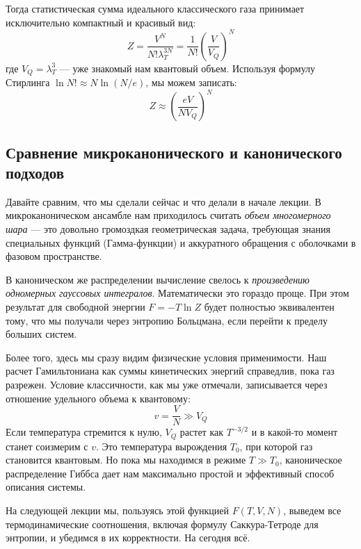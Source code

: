 \documentclass[../general/general]{subfiles}
\begin{document}
Тогда статистическая сумма идеального классического газа принимает исключительно компактный и красивый вид:
\begin{equation}
Z = \frac{V^N}{N! \lambda_T^{3N}} = \frac{1}{N!} \left( \frac{V}{V_Q} \right)^N
\end{equation}
где $V_Q = \lambda_T^3$ — уже знакомый нам квантовый объем. Используя формулу Стирлинга $\ln N! \approx N \ln(N/e)$, мы можем записать:
\begin{equation}
Z \approx \left( \frac{eV}{N V_Q} \right)^N
\end{equation}

\subsection{Сравнение микроканонического и канонического подходов}

Давайте сравним, что мы сделали сейчас и что делали в начале лекции. 
В микроканоническом ансамбле нам приходилось считать \textit{объем многомерного шара} — это довольно громоздкая геометрическая задача, требующая знания специальных функций (Гамма-функции) и аккуратного обращения с оболочками в фазовом пространстве.

В каноническом же распределении вычисление свелось к \textit{произведению одномерных гауссовых интегралов}. Математически это гораздо проще. При этом результат для свободной энергии $F = -T \ln Z$ будет полностью эквивалентен тому, что мы получали через энтропию Больцмана, если перейти к пределу больших систем.

Более того, здесь мы сразу видим физические условия применимости. Наш расчет Гамильтониана как суммы кинетических энергий справедлив, пока газ разрежен. Условие классичности, как мы уже отмечали, записывается через отношение удельного объема к квантовому:
\begin{equation}
v = \frac{V}{N} \gg V_Q
\end{equation}
Если температура стремится к нулю, $V_Q$ растет как $T^{-3/2}$ и в какой-то момент станет соизмерим с $v$. Это температура вырождения $T_0$, при которой газ становится квантовым. Но пока мы находимся в режиме $T \gg T_0$, каноническое распределение Гиббса дает нам максимально простой и эффективный способ описания системы.

На следующей лекции мы, пользуясь этой функцией $F(T, V, N)$, выведем все термодинамические соотношения, включая формулу Саккура-Тетроде для энтропии, и убедимся в их корректности. На сегодня всё.
\end{document}
